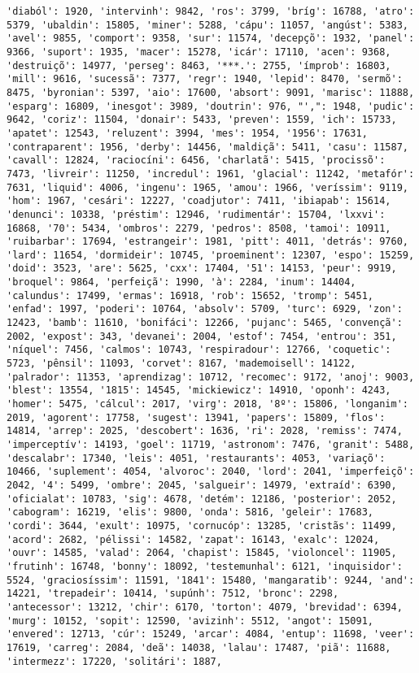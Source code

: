 \documentclass[11pt]{article}
\begin{document}
\begin{Verbatim}[commandchars=\\\{\}]
'diaból': 1920, 'intervinh': 9842, 'ros': 3799, 'bríg': 16788, 'atro': 5379, 'ubaldin': 15805, 'miner': 5288, 'cápu': 11057, 'angúst': 5383, 'avel': 9855, 'comport': 9358, 'sur': 11574, 'decepçõ': 1932, 'panel': 9366, 'suport': 1935, 'macer': 15278, 'icár': 17110, 'acen': 9368, 'destruiçõ': 14977, 'perseg': 8463, '***.': 2755, 'ímprob': 16803, 'mill': 9616, 'sucessã': 7377, 'regr': 1940, 'lepid': 8470, 'sermõ': 8475, 'byronian': 5397, 'aio': 17600, 'absort': 9091, 'marisc': 11888, 'esparg': 16809, 'inesgot': 3989, 'doutrin': 976, "',": 1948, 'pudic': 9642, 'coriz': 11504, 'donair': 5433, 'preven': 1559, 'ich': 15733, 'apatet': 12543, 'reluzent': 3994, 'mes': 1954, '1956': 17631, 'contraparent': 1956, 'derby': 14456, 'maldiçã': 5411, 'casu': 11587, 'cavall': 12824, 'raciocíni': 6456, 'charlatã': 5415, 'procissõ': 7473, 'livreir': 11250, 'incredul': 1961, 'glacial': 11242, 'metafór': 7631, 'liquid': 4006, 'ingenu': 1965, 'amou': 1966, 'veríssim': 9119, 'hom': 1967, 'cesári': 12227, 'coadjutor': 7411, 'ibiapab': 15614, 'denunci': 10338, 'préstim': 12946, 'rudimentár': 15704, 'lxxvi': 16868, '70': 5434, 'ombros': 2279, 'pedros': 8508, 'tamoi': 10911, 'ruibarbar': 17694, 'estrangeir': 1981, 'pitt': 4011, 'detrás': 9760, 'lard': 11654, 'dormideir': 10745, 'proeminent': 12307, 'espo': 15259, 'doid': 3523, 'are': 5625, 'cxx': 17404, '51': 14153, 'peur': 9919, 'broquel': 9864, 'perfeiçã': 1990, 'à': 2284, 'inum': 14404, 'calundus': 17499, 'ermas': 16918, 'rob': 15652, 'tromp': 5451, 'enfad': 1997, 'poderi': 10764, 'absolv': 5709, 'turc': 6929, 'zon': 12423, 'bamb': 11610, 'bonifáci': 12266, 'pujanc': 5465, 'convençã': 2002, 'expost': 343, 'devanei': 2004, 'estof': 7454, 'entrou': 351, 'níquel': 7456, 'calmos': 10743, 'respiradour': 12766, 'coquetic': 5723, 'pênsil': 11093, 'corvet': 8167, 'mademoisell': 14122, 'palrador': 11353, 'aprendizag': 10712, 'recomec': 9172, 'anoj': 9003, 'blest': 13554, '1815': 14545, 'mickiewicz': 14910, 'oponh': 4243, 'homer': 5475, 'cálcul': 2017, 'virg': 2018, '8º': 15806, 'longanim': 2019, 'agorent': 17758, 'sugest': 13941, 'papers': 15809, 'flos': 14814, 'arrep': 2025, 'descobert': 1636, 'ri': 2028, 'remiss': 7474, 'imperceptív': 14193, 'goel': 11719, 'astronom': 7476, 'granit': 5488, 'descalabr': 17340, 'leis': 4051, 'restaurants': 4053, 'variaçõ': 10466, 'suplement': 4054, 'alvoroc': 2040, 'lord': 2041, 'imperfeiçõ': 2042, '4': 5499, 'ombre': 2045, 'salgueir': 14979, 'extraíd': 6390, 'oficialat': 10783, 'sig': 4678, 'detém': 12186, 'posterior': 2052, 'cabogram': 16219, 'elis': 9800, 'onda': 5816, 'geleir': 17683, 'cordi': 3644, 'exult': 10975, 'cornucóp': 13285, 'cristãs': 11499, 'acord': 2682, 'pélissi': 14582, 'zapat': 16143, 'exalc': 12024, 'ouvr': 14585, 'valad': 2064, 'chapist': 15845, 'violoncel': 11905, 'frutinh': 16748, 'bonny': 18092, 'testemunhal': 6121, 'inquisidor': 5524, 'graciosíssim': 11591, '1841': 15480, 'mangaratib': 9244, 'and': 14221, 'trepadeir': 10414, 'supúnh': 7512, 'bronc': 2298, 'antecessor': 13212, 'chir': 6170, 'torton': 4079, 'brevidad': 6394, 'murg': 10152, 'sopit': 12590, 'avizinh': 5512, 'angot': 15091, 'envered': 12713, 'cúr': 15249, 'arcar': 4084, 'entup': 11698, 'veer': 17619, 'carreg': 2084, 'deã': 14038, 'lalau': 17487, 'piã': 11688, 'intermezz': 17220, 'solitári': 1887, 
\end{Verbatim}
\end{document}

